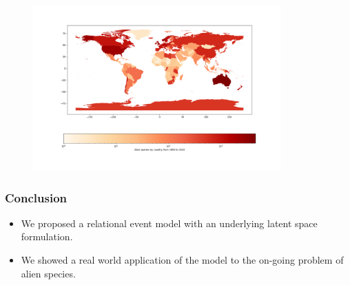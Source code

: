 \documentclass[
	11pt, %
]{beamer}
\begin{document}
\begin{frame}
\begin{figure}[ht]
    \centering
    \includegraphics[width=0.85\textwidth]{region_invasion.png}
\end{figure}
\end{frame}



\begin{frame}
\frametitle{Conclusion}
\begin{itemize}
\item We proposed a relational event model with an underlying latent space formulation.
\item We showed a real world application of the model to the on-going problem of alien species.
\end{itemize}
\end{frame}

\end{document}
